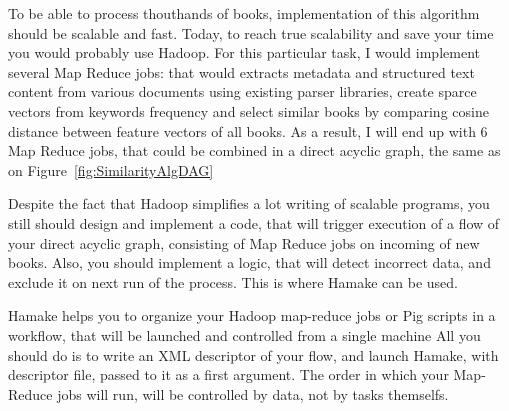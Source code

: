 \documentclass{article}
\begin{document}
To be able to process thouthands of books, implementation of this algorithm should be scalable and fast.
Today, to reach true scalability and save your time you would probably use Hadoop. For this particular task,
 I would implement several Map Reduce jobs: that would extracts metadata and structured text content from
 various documents using existing parser libraries, create sparce vectors from keywords frequency and select similar books by comparing cosine distance between feature vectors of all books. 
As a result, I will end up with 6 Map Reduce jobs, that could be combined in a direct acyclic graph, the same as on Figure~\ref{fig:SimilarityAlgDAG}

Despite the fact that Hadoop simplifies a lot writing of scalable programs, you still should design and implement a code, that
will trigger execution of a flow of your direct acyclic graph, consisting of Map Reduce jobs on incoming of new books. Also, you should implement a logic,
that will detect incorrect data, and exclude it on next run of the process. This is where Hamake can be used. 

Hamake helps you to organize your Hadoop map-reduce jobs or Pig scripts in a workflow, that will be launched and controlled from a single machine
All you should do is to write an XML descriptor of your flow, and launch Hamake, with descriptor file, passed to it as a first argument. The order
in which your Map-Reduce jobs will run, will be controlled by data, not by tasks themselfs.
\end{document}
